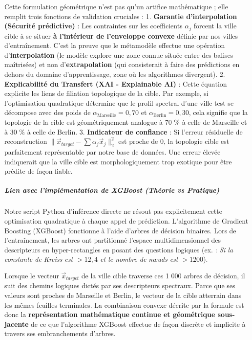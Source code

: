 \documentclass[10pt, a4paper]{article}
\begin{document}
Cette formulation géométrique n'est pas qu'un artifice mathématique ;
elle remplit trois fonctions de validation cruciales : 1.
\textbf{Garantie d'interpolation (Sécurité prédictive)} : Les
contraintes sur les coefficients \(\alpha_j\) forcent la ville cible à
se situer \textbf{à l'intérieur de l'enveloppe convexe} définie par nos
villes d'entraînement. C'est la preuve que le métamodèle effectue une
opération d'\textbf{interpolation} (le modèle explore une zone connue
située entre des balises maîtrisées) et non d'\textbf{extrapolation}
(qui consisterait à faire des prédictions en dehors du domaine
d'apprentissage, zone où les algorithmes divergent). 2.
\textbf{Explicabilité du Transfert (XAI - Explainable AI)} : Cette
équation explicite les liens de filiation topologique de la cible. Par
exemple, si l'optimisation quadratique détermine que le profil spectral
d'une ville test se décompose avec des poids de
\(\alpha_{\text{Marseille}} = 0,70\) et
\(\alpha_{\text{Berlin}} = 0,30\), cela signifie que la topologie de la
cible est géométriquement analogue à 70 \% à celle de Marseille et à 30
\% à celle de Berlin. 3. \textbf{Indicateur de confiance} : Si l'erreur
résiduelle de reconstruction
\(\|\vec{x}_{target} - \sum \alpha_j \vec{x}_j\|_2^2\) est proche de 0,
la topologie cible est parfaitement représentable par notre base de
données. Une erreur élevée indiquerait que la ville cible est
morphologiquement trop exotique pour être prédite de façon fiable.

\subparagraph{Lien avec l'implémentation de XGBoost (Théorie vs
Pratique)}\label{lien-avec-limpluxe9mentation-de-xgboost-thuxe9orie-vs-pratique}

Notre script Python d'inférence directe ne résout pas explicitement
cette optimisation quadratique à chaque appel de prédiction.
L'algorithme de Gradient Boosting (XGBoost) fonctionne à l'aide d'arbres
de décision binaires. Lors de l'entraînement, les arbres ont partitionné
l'espace multidimensionnel des descripteurs en hyper-rectangles en
posant des questions logiques (ex. : \emph{Si la constante de Kreiss est
\(> 12,4\) et le nombre de nœuds est \(> 1200\)}).

Lorsque le vecteur \(\vec{x}_{target}\) de la ville cible traverse ces 1
000 arbres de décision, il suit des chemins logiques dictés par ses
descripteurs spectraux. Parce que ses valeurs sont proches de Marseille
et Berlin, le vecteur de la cible atterrain dans les mêmes feuilles
terminales. La combinaison convexe décrite par la formule est donc la
\textbf{représentation mathématique continue et géométrique
sous-jacente} de ce que l'algorithme XGBoost effectue de façon discrète
et implicite à travers ses embranchements d'arbres.
\end{document}

